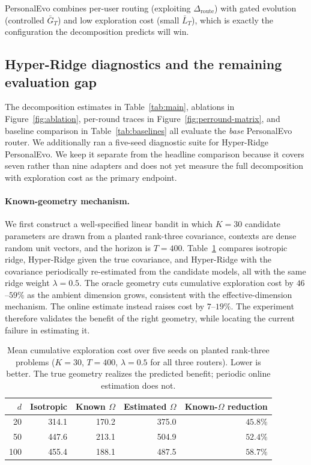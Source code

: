 \documentclass{article} %
\begin{document}
PersonalEvo combines per-user routing (exploiting $\Delta_{\mathrm{route}}$) with gated evolution (controlled $\bar G_T$) and low exploration cost (small $\bar L_T$), which is exactly the configuration the decomposition predicts will win.

\subsection{Hyper-Ridge diagnostics and the remaining evaluation gap}
\label{sec:exp-hyper-ridge-plan}

The decomposition estimates in Table~\ref{tab:main}, ablations in Figure~\ref{fig:ablation}, per-round traces in Figure~\ref{fig:perround-matrix}, and baseline comparison in Table~\ref{tab:baselines} all evaluate the \emph{base} PersonalEvo router. We additionally ran a five-seed diagnostic suite for Hyper-Ridge PersonalEvo. We keep it separate from the headline comparison because it covers seven rather than nine adapters and does not yet measure the full decomposition with exploration cost as the primary endpoint.

\paragraph{Known-geometry mechanism.}
We first construct a well-specified linear bandit in which $K=30$ candidate parameters are drawn from a planted rank-three covariance, contexts are dense random unit vectors, and the horizon is $T=400$. Table~\ref{tab:hyper-diagnostic} compares isotropic ridge, Hyper-Ridge given the true covariance, and Hyper-Ridge with the covariance periodically re-estimated from the candidate models, all with the same ridge weight $\lambda=0.5$. The oracle geometry cuts cumulative exploration cost by $46$--$59\%$ as the ambient dimension grows, consistent with the effective-dimension mechanism. The online estimate instead raises cost by $7$--$19\%$. The experiment therefore validates the benefit of the right geometry, while locating the current failure in estimating it.

\begin{table}[H]
\centering
\small
\begin{tabular}{rrrrr}
\toprule
$d$ & Isotropic & Known $\Omega$ & Estimated $\Omega$ & Known-$\Omega$ reduction \\
\midrule
20  & 314.1 & 170.2 & 375.0 & $45.8\%$ \\
50  & 447.6 & 213.1 & 504.9 & $52.4\%$ \\
100 & 455.4 & 188.1 & 487.5 & $58.7\%$ \\
\bottomrule
\end{tabular}
\caption{Mean cumulative exploration cost over five seeds on planted rank-three problems ($K=30$, $T=400$, $\lambda=0.5$ for all three routers). Lower is better. The true geometry realizes the predicted benefit; periodic online estimation does not.}
\label{tab:hyper-diagnostic}
\end{table}
\end{document}
